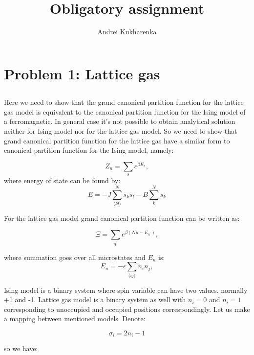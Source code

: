 \documentclass[10pt]{article}
\title{Obligatory assignment}
\author{Andrei Kukharenka}
\begin{document}
\maketitle

\section{Problem 1: Lattice gas}
\subsection{}
Here we need to show that the grand canonical partition function for the lattice gas model is equivalent to the
canonical partition function for the Ising model of a ferromagnetic. In general case it's not possible to obtain analytical solution neither for Ising model nor for the lattice gas model. So we need to show that grand canonical partition function for the lattice gas have a similar form to canonical partition function for the Ising model, namely:


\begin{equation}\label{isingpartfun}
Z_n=\sum_{s}e^{\beta E_s},
\end{equation}
where energy of state can be found by:
\begin{equation}\label{isingenergy}
E=-J\sum_{\langle kl\rangle }^{N}s_{k}s_{l} - B\sum_{k}^{N}s_k
\end{equation}

For the lattice gas model grand canonical partition function can be written as:

\begin{equation}\label{latgaspartfun}
\Xi =\sum_{n^\prime}e^{\beta(N\mu - E_{n^{\prime}})},
\end{equation}

where summation goes over all microstates and $E_n$ is:
\begin{equation}\label{latgasen}
E_n= - \epsilon \sum_{\langle ij\rangle }n_i n_j,
\end{equation}


Ising model is a binary system where spin variable can have two values, normally +1 and -1. Lattice gas model is a binary system as well with $n_i=0$ and $n_i=1$ corresponding to unoccupied and occupied positions correspondingly. Let us make a mapping between mentioned models. Denote:

\[
\sigma_i = 2n_i - 1
\]

so we have:
\end{document}
